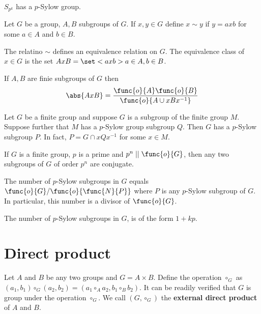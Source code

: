 \begin{lemma}
    \(S_{p^k}\) has a \(p\)-Sylow group.
\end{lemma}

\begin{definition}
    Let \(G\) be a group, \(A,B\) subgroups of \(G\). If \(x,y \in G\) define \(x \sim y\) if \(y = axb\) for some \(a \in A\) and \(b \in B\). 
\end{definition}

\begin{lemma}
    The relatino \( \sim \) defines an equivalence relation on \(G\). The equivalence class of \(x \in G\) is the set \(AxB = \set<axb>{a \in A, b \in B}\).
\end{lemma}

\begin{lemma}
    If \(A,B\) are finie subgroups of \(G\) then 
    \begin{equation*}
        \abs{AxB} = \dfrac{\func{o}{A} \func{o}{B}}{\func{o}{A \cup xBx^{-1}}}
    \end{equation*}
\end{lemma}

\begin{lemma}
    Let \(G\) be a finite group and suppose \(G\) is a subgroup of the finite group \(M\). Suppose further that \(M\) has a \(p\)-Sylow group subgroup \(Q\). Then \(G\) has a \(p\)-Sylow subgroup \(P\). In fact, \(P = G \cap xQx^{-1}\) for some \(x \in M\).
\end{lemma}

\begin{theorem}
    If \(G\) is a finite group, \(p\) is a prime and \(p^n \mid\mid \func{o}{G}\), then any two subgroups of \(G\) of order \(p^n\) are conjugate.
\end{theorem}

\begin{lemma}
    The number of \(p\)-Sylow subgroups in \(G\) equals \(\func{o}{G}/\func{o}{\func{N}{P}}\) where \(P\) is any \(p\)-Sylow subgroup of \(G\). In particular, this number is a divisor of \(\func{o}{G}\).
\end{lemma}

\begin{theorem}
    The number of \(p\)-Sylow subgroups in \(G\), is of the form \(1 + kp\).
\end{theorem}
\section{Direct product}
Let \(A\) and \(B\) be any two groups and \(G = A \times B\). Define the operation \(\circ_G\) as \((a_1,b_1) \circ_G (a_2,b_2) = (a_1\circ_A a_2, b_1 \circ_B b_2)\). It can be readily verified that \(G\) is group under the operation \(\circ_G\). We call \((G,\circ_G)\) the \textbf{external direct product} of \(A\) and \(B\).

